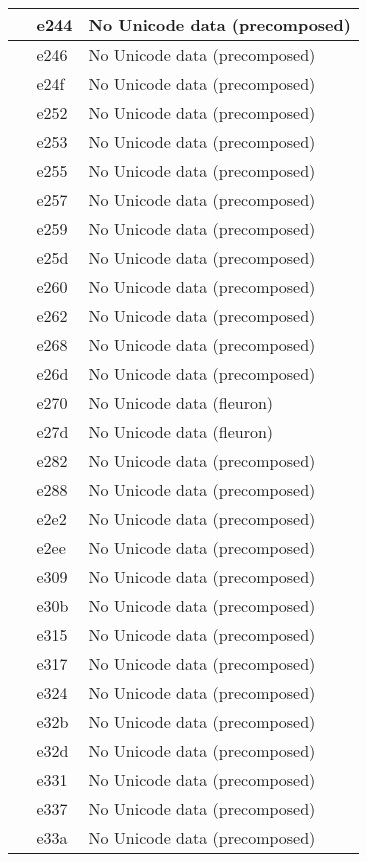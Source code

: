 \documentclass[12pt,letterpaper,openany]{book}
\begin{document}
\begin{center}
\begin{supertabular}{|m{0.25in}|m{0.5in}|m{4in}|}
			 & e244 & No Unicode data (precomposed)\\\hline
			 & e246 & No Unicode data (precomposed)\\\hline
			 & e24f & No Unicode data (precomposed)\\\hline
			 & e252 & No Unicode data (precomposed)\\\hline
			 & e253 & No Unicode data (precomposed)\\\hline
			 & e255 & No Unicode data (precomposed)\\\hline
			 & e257 & No Unicode data (precomposed)\\\hline
			 & e259 & No Unicode data (precomposed)\\\hline
			 & e25d & No Unicode data (precomposed)\\\hline
			 & e260 & No Unicode data (precomposed)\\\hline
			 & e262 & No Unicode data (precomposed)\\\hline
			 & e268 & No Unicode data (precomposed)\\\hline
			 & e26d & No Unicode data (precomposed)\\\hline
			 & e270 & No Unicode data (fleuron)\\\hline
			 & e27d & No Unicode data (fleuron)\\\hline
			 & e282 & No Unicode data (precomposed)\\\hline
			 & e288 & No Unicode data (precomposed)\\\hline
			 & e2e2 & No Unicode data (precomposed)\\\hline
			 & e2ee & No Unicode data (precomposed)\\\hline
			 & e309 & No Unicode data (precomposed)\\\hline
			 & e30b & No Unicode data (precomposed)\\\hline
			 & e315 & No Unicode data (precomposed)\\\hline
			 & e317 & No Unicode data (precomposed)\\\hline
			 & e324 & No Unicode data (precomposed)\\\hline
			 & e32b & No Unicode data (precomposed)\\\hline
			 & e32d & No Unicode data (precomposed)\\\hline
			 & e331 & No Unicode data (precomposed)\\\hline
			 & e337 & No Unicode data (precomposed)\\\hline
			 & e33a & No Unicode data (precomposed)\\\hline

\end{supertabular}
\end{center}
\end{document}
